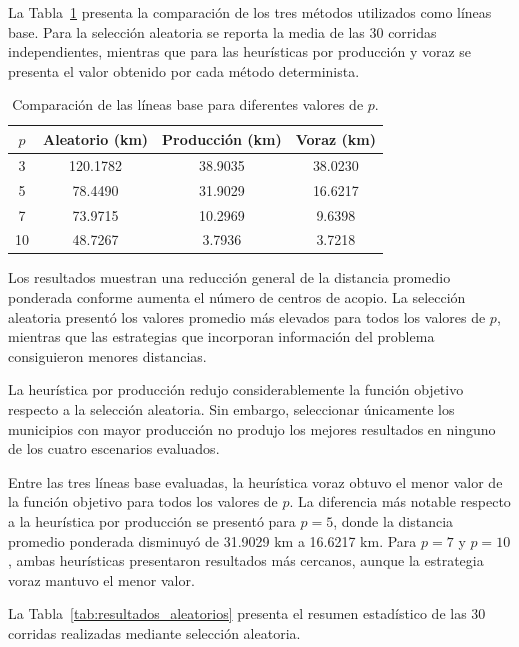 \documentclass[journal]{IEEEtran}
\begin{document}
La Tabla~\ref{tab:resultados_lineas_base} presenta la comparación de los tres métodos utilizados como líneas base. Para la selección aleatoria se reporta la media de las 30 corridas independientes, mientras que para las heurísticas por producción y voraz se presenta el valor obtenido por cada método determinista.

\begin{table}[!t]
	\centering
	\caption{Comparación de las líneas base para diferentes valores de $p$.}
	\label{tab:resultados_lineas_base}
	\begin{tabular}{cccc}
		\toprule
		\textbf{$p$} &
		\textbf{Aleatorio (km)} &
		\textbf{Producción (km)} &
		\textbf{Voraz (km)} \\
		\midrule
		3  & 120.1782 & 38.9035 & 38.0230 \\
		5  &  78.4490 & 31.9029 & 16.6217 \\
		7  &  73.9715 & 10.2969 &  9.6398 \\
		10 &  48.7267 &  3.7936 &  3.7218 \\
		\bottomrule
	\end{tabular}
\end{table}

Los resultados muestran una reducción general de la distancia promedio ponderada conforme aumenta el número de centros de acopio. La selección aleatoria presentó los valores promedio más elevados para todos los valores de $p$, mientras que las estrategias que incorporan información del problema consiguieron menores distancias.

La heurística por producción redujo considerablemente la función objetivo respecto a la selección aleatoria. Sin embargo, seleccionar únicamente los municipios con mayor producción no produjo los mejores resultados en ninguno de los cuatro escenarios evaluados.

Entre las tres líneas base evaluadas, la heurística voraz obtuvo el menor valor de la función objetivo para todos los valores de $p$. La diferencia más notable respecto a la heurística por producción se presentó para $p=5$, donde la distancia promedio ponderada disminuyó de 31.9029 km a 16.6217 km. Para $p=7$ y $p=10$, ambas heurísticas presentaron resultados más cercanos, aunque la estrategia voraz mantuvo el menor valor.

La Tabla~\ref{tab:resultados_aleatorios} presenta el resumen estadístico de las 30 corridas realizadas mediante selección aleatoria.
\end{document}
